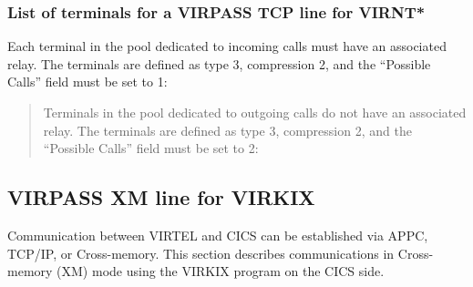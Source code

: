 \documentclass[letterpaper,10pt,english]{sphinxmanual}
\begin{document}
\subsubsection{List of terminals for a VIRPASS TCP line for VIRNT*}
\label{\detokenize{connectivity_guide:list-of-terminals-for-a-virpass-tcp-line-for-virnt}}
Each terminal in the pool dedicated to incoming calls must have an associated relay. The terminals are defined as type 3, compression 2, and the “Possible Calls” field must be set to 1:


\begin{quote}

Terminals in the pool dedicated to outgoing calls do not have an associated relay. The terminals are defined as type 3, compression 2, and the “Possible Calls” field must be set to 2:
\end{quote}




\subsection{VIRPASS XM line for VIRKIX}
\label{\detokenize{connectivity_guide:virpass-xm-line-for-virkix}}
Communication between VIRTEL and CICS can be established via APPC, TCP/IP, or Cross-memory. This section describes communications in Cross-memory (XM) mode using the VIRKIX program on the CICS side.

\end{document}
